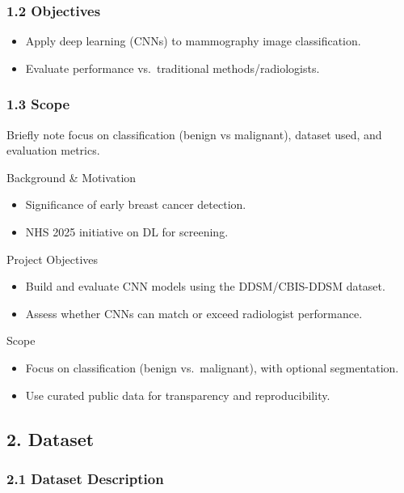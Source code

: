 \documentclass[
  12pt,
  letterpaper,
  DIV=11,
  numbers=noendperiod]{scrartcl}
\providecommand{\tightlist}{%
  \setlength{\itemsep}{0pt}\setlength{\parskip}{0pt}}
\begin{document}
\subsubsection{1.2 Objectives}\label{objectives}

\begin{itemize}
\tightlist
\item
  Apply deep learning (CNNs) to mammography image classification.
\item
  Evaluate performance vs.~traditional methods/radiologists.
\end{itemize}

\subsubsection{1.3 Scope}\label{scope}

Briefly note focus on classification (benign vs malignant), dataset
used, and evaluation metrics.

Background \& Motivation

\begin{itemize}
\tightlist
\item
  Significance of early breast cancer detection.
\item
  NHS 2025 initiative on DL for screening.
\end{itemize}

Project Objectives

\begin{itemize}
\tightlist
\item
  Build and evaluate CNN models using the DDSM/CBIS-DDSM dataset.
\item
  Assess whether CNNs can match or exceed radiologist performance.
\end{itemize}

Scope

\begin{itemize}
\tightlist
\item
  Focus on classification (benign vs.~malignant), with optional
  segmentation.
\item
  Use curated public data for transparency and reproducibility.
\end{itemize}

\subsection{2. Dataset}\label{dataset}

\subsubsection{2.1 Dataset Description}\label{dataset-description}
\end{document}
